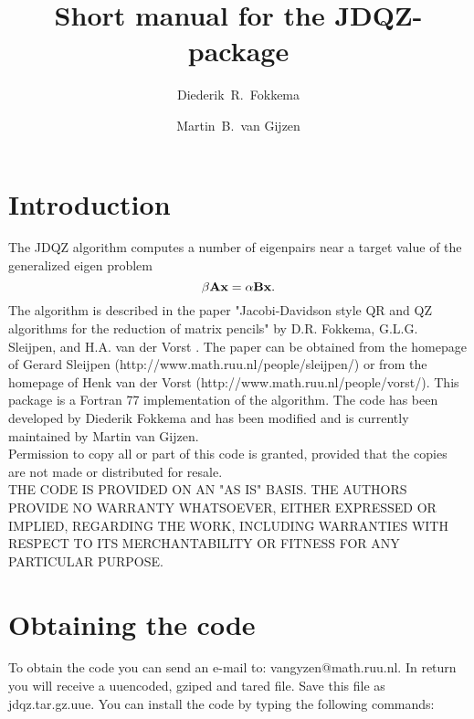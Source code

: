 \documentclass[12pt,a4paper]{article}
\title{Short manual for the JDQZ-package}
\author{Diederik~R.\ Fokkema%
\footnotemark[1]\hspace{1ex}
    \and
  Martin~B.\ van Gijzen\footnotemark[3]}
\def\BA{{\bf A}}\def\BB{{\bf B}}
\def\Bx{{\bf x}}\def\Br{{\bf r}}
\begin{document}
\maketitle
 \renewcommand{\thefootnote}{\fnsymbol{footnote}}

 \renewcommand{\thefootnote}{\arabic{footnote}}

\section{Introduction}
The JDQZ algorithm computes a number of eigenpairs near a target value of the 
generalized eigen problem
\begin{equation}
  \beta \BA \Bx = \alpha \BB \Bx .
  \label{eq:system}
\end{equation}
The algorithm is described in the paper
"Jacobi-Davidson style QR and QZ algorithms for the reduction of matrix pencils" by D.R. Fokkema, G.L.G. Sleijpen, and H.A. van der Vorst \cite{jdqz}. 
The paper can be obtained from the homepage of Gerard Sleijpen 
(http://www.math.ruu.nl/people/sleijpen/) or from the homepage of Henk van der 
Vorst (http://www.math.ruu.nl/people/vorst/). 
This package is a Fortran 77 implementation of the algorithm.
The code has been developed
by Diederik Fokkema and has been modified and is currently maintained by 
Martin van Gijzen. \\
Permission to copy all or part of this code is granted, provided
that the copies are not made or distributed for resale.\\
THE CODE IS PROVIDED ON AN "AS IS" BASIS.  THE AUTHORS PROVIDE NO
WARRANTY WHATSOEVER, EITHER EXPRESSED OR IMPLIED, REGARDING THE WORK,
INCLUDING WARRANTIES WITH RESPECT TO ITS MERCHANTABILITY OR FITNESS
FOR ANY PARTICULAR PURPOSE.\\
\section{Obtaining the code}
To obtain the code you can send an e-mail to: vangyzen@math.ruu.nl.
In return you will receive a uuencoded, gziped and tared file.
Save this file as jdqz.tar.gz.uue.
You can install the code by typing the following commands:\\
\end{document}
